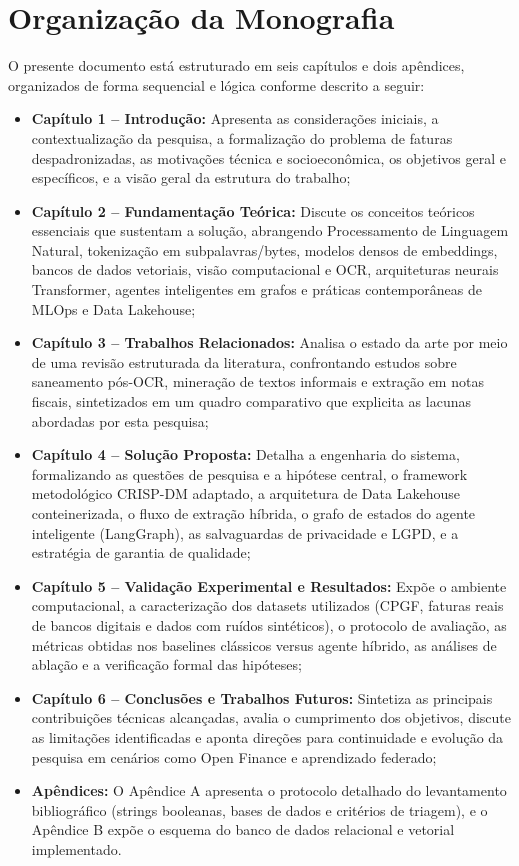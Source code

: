 \documentclass[
	12pt,				
	openright,			
	oneside,			
	a4paper,			
	english,			
	brazil				
	]{abntex2}
\begin{document}
\section{Organização da Monografia}
\label{sec:intro_organizacao}

O presente documento está estruturado em seis capítulos e dois apêndices, organizados de forma sequencial e lógica conforme descrito a seguir:

\begin{itemize}
    \item \textbf{Capítulo 1 -- Introdução:} Apresenta as considerações iniciais, a contextualização da pesquisa, a formalização do problema de faturas despadronizadas, as motivações técnica e socioeconômica, os objetivos geral e específicos, e a visão geral da estrutura do trabalho;
    \item \textbf{Capítulo 2 -- Fundamentação Teórica:} Discute os conceitos teóricos essenciais que sustentam a solução, abrangendo Processamento de Linguagem Natural, tokenização em subpalavras/bytes, modelos densos de embeddings, bancos de dados vetoriais, visão computacional e OCR, arquiteturas neurais Transformer, agentes inteligentes em grafos e práticas contemporâneas de MLOps e Data Lakehouse;
    \item \textbf{Capítulo 3 -- Trabalhos Relacionados:} Analisa o estado da arte por meio de uma revisão estruturada da literatura, confrontando estudos sobre saneamento pós-OCR, mineração de textos informais e extração em notas fiscais, sintetizados em um quadro comparativo que explicita as lacunas abordadas por esta pesquisa;
    \item \textbf{Capítulo 4 -- Solução Proposta:} Detalha a engenharia do sistema, formalizando as questões de pesquisa e a hipótese central, o framework metodológico CRISP-DM adaptado, a arquitetura de Data Lakehouse conteinerizada, o fluxo de extração híbrida, o grafo de estados do agente inteligente (LangGraph), as salvaguardas de privacidade e LGPD, e a estratégia de garantia de qualidade;
    \item \textbf{Capítulo 5 -- Validação Experimental e Resultados:} Expõe o ambiente computacional, a caracterização dos datasets utilizados (CPGF, faturas reais de bancos digitais e dados com ruídos sintéticos), o protocolo de avaliação, as métricas obtidas nos baselines clássicos versus agente híbrido, as análises de ablação e a verificação formal das hipóteses;
    \item \textbf{Capítulo 6 -- Conclusões e Trabalhos Futuros:} Sintetiza as principais contribuições técnicas alcançadas, avalia o cumprimento dos objetivos, discute as limitações identificadas e aponta direções para continuidade e evolução da pesquisa em cenários como Open Finance e aprendizado federado;
    \item \textbf{Apêndices:} O Apêndice A apresenta o protocolo detalhado do levantamento bibliográfico (strings booleanas, bases de dados e critérios de triagem), e o Apêndice B expõe o esquema do banco de dados relacional e vetorial implementado.
\end{itemize}
\end{document}
